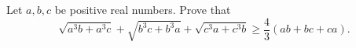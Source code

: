 Let $a, b,c$ be positive real numbers. Prove that \[\sqrt{a^3b+a^3c}+\sqrt{b^3c+b^3a}+\sqrt{c^3a+c^3b}\ge \frac{4}{3} (ab+bc+ca).\]
